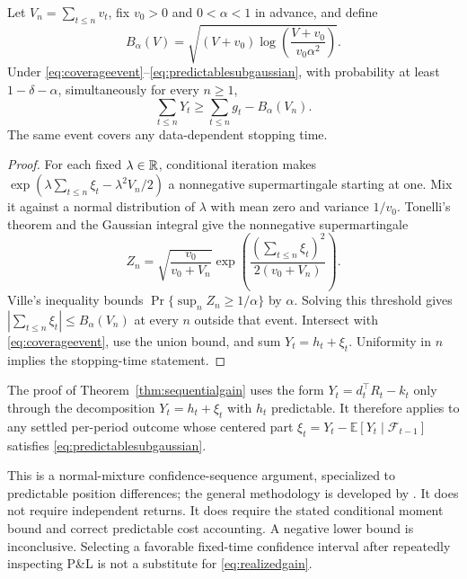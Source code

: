 \begin{theorem}
\label{thm:sequentialgain}
Let $V_n=\sum_{t\le n}v_t$, fix $v_0>0$ and $0<\alpha<1$ in advance,
and define
\begin{equation}\label{eq:mixtureboundary}
 B_\alpha(V)=
 \sqrt{(V+v_0)\log\!\left(\frac{V+v_0}{v_0\alpha^2}\right)}.
\end{equation}
Under \eqref{eq:coverageevent}--\eqref{eq:predictablesubgaussian}, with
probability at least $1-\delta-\alpha$, simultaneously for every $n\ge1$,
\begin{equation}\label{eq:realizedgain}
 \sum_{t\le n}Y_t\ge\sum_{t\le n}g_t-B_\alpha(V_n).
\end{equation}
The same event covers any data-dependent stopping time.
\end{theorem}
\begin{proof}
For each fixed $\lambda\in\mathbb R$, conditional iteration makes
$\exp(\lambda\sum_{t\le n}\xi_t-\lambda^2 V_n/2)$ a nonnegative
supermartingale starting at one. Mix it against a normal distribution
of $\lambda$ with mean zero and variance $1/v_0$. Tonelli's theorem and
the Gaussian integral give the nonnegative supermartingale
\[
 Z_n=\sqrt{\frac{v_0}{v_0+V_n}}
       \exp\!\left(\frac{(\sum_{t\le n}\xi_t)^2}{2(v_0+V_n)}\right).
\]
Ville's inequality bounds $\Pr\{\sup_n Z_n\ge1/\alpha\}$ by $\alpha$.
Solving this threshold gives
$|\sum_{t\le n}\xi_t|\le B_\alpha(V_n)$ at every $n$ outside that event.
Intersect with \eqref{eq:coverageevent}, use the union bound, and sum
$Y_t=h_t+\xi_t$. Uniformity in $n$ implies the stopping-time statement.
\end{proof}

\begin{remark}\label{rem:sequential-general}
The proof of Theorem~\ref{thm:sequentialgain} uses the form
$Y_t=d_t^\top R_t-k_t$ only through the decomposition $Y_t=h_t+\xi_t$ with
$h_t$ predictable. It therefore applies to any settled per-period outcome whose
centered part $\xi_t=Y_t-\mathbb E[Y_t\mid\mathcal F_{t-1}]$ satisfies \eqref{eq:predictablesubgaussian}.
\end{remark}

This is a normal-mixture confidence-sequence argument, specialized to
predictable position differences; the general methodology is developed
by \citet{HowardEtAl2021}. It does not require independent returns.
It does require the stated conditional moment bound and correct predictable
cost accounting. A negative lower bound is inconclusive. Selecting a favorable
fixed-time confidence interval after repeatedly inspecting P\&L is not a
substitute for \eqref{eq:realizedgain}.

